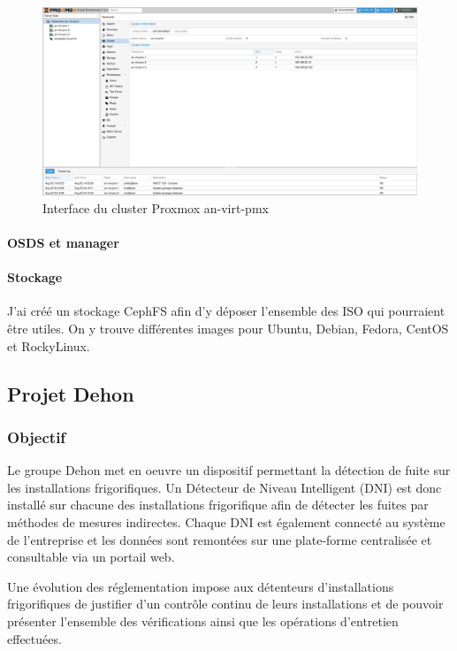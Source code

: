 \documentclass[12pt]{article}
\begin{document}
\begin{figure}
    \centering
        \includegraphics[width=\textwidth]{src/proxmox_interface.png}
    \caption{Interface du cluster Proxmox an-virt-pmx}
    \label{fig:proxmox_virt1}
\end{figure}

\paragraph{OSDS et manager}


\paragraph{Stockage}
J'ai créé un stockage CephFS afin d'y déposer l'ensemble des ISO qui pourraient être utiles. 
On y trouve différentes images pour Ubuntu, Debian, Fedora, CentOS et RockyLinux.

\newpage
\subsection{Projet Dehon} \label{dehon}
\subsubsection{Objectif}

Le groupe Dehon met en oeuvre un dispositif permettant la détection de fuite sur les installations frigorifiques. 
Un Détecteur de Niveau Intelligent (DNI) est donc installé sur chacune des installations frigorifique afin de détecter les fuites par méthodes de mesures indirectes.
Chaque DNI est également connecté au système de l'entreprise et les données sont remontées sur une plate-forme centralisée et consultable via un portail web. 

Une évolution des réglementation impose aux détenteurs d'installations frigorifiques de justifier d'un contrôle continu de leurs installations et de pouvoir présenter l'ensemble des vérifications ainsi que les opérations d'entretien effectuées.
\end{document}
